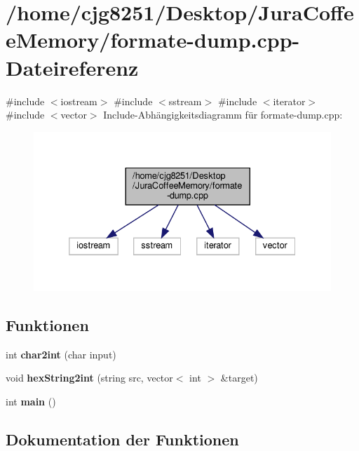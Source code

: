 \section{/home/cjg8251/\+Desktop/\+Jura\+Coffee\+Memory/formate-\/dump.cpp-\/\+Dateireferenz}
\label{formate-dump_8cpp}
{\ttfamily \#include $<$iostream$>$}\newline
{\ttfamily \#include $<$sstream$>$}\newline
{\ttfamily \#include $<$iterator$>$}\newline
{\ttfamily \#include $<$vector$>$}\newline
Include-\/\+Abhängigkeitsdiagramm für formate-\/dump.cpp\+:
\nopagebreak
\begin{figure}[H]
\begin{center}
\leavevmode
\includegraphics[width=332pt]{formate-dump_8cpp__incl}
\end{center}
\end{figure}
\subsection*{Funktionen}
\begin{DoxyCompactItemize}
\item 
int \textbf{ char2int} (char input)
\item 
void \textbf{ hex\+String2int} (string src, vector$<$ int $>$ \&target)
\item 
int \textbf{ main} ()
\end{DoxyCompactItemize}


\subsection{Dokumentation der Funktionen}
\mbox{\label{formate-dump_8cpp_abe92b9df929b37f25b0e7d321dcc00fb}} 
